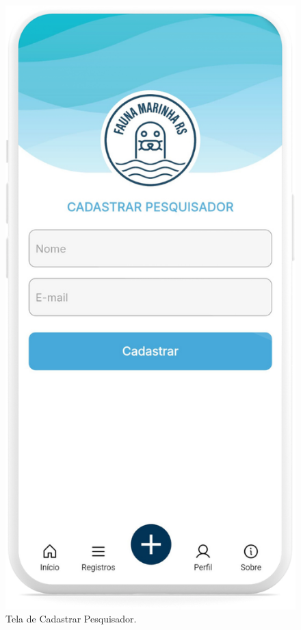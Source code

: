 \begin{figure}[H]
    \centering
    \includegraphics[height=0.7\textheight]{imagens/sistema/device_frame/cadastrarPesq.png}
    \caption{Tela de Cadastrar Pesquisador.}
    \label{fig:adicionar-pesquisador}
\end{figure}

